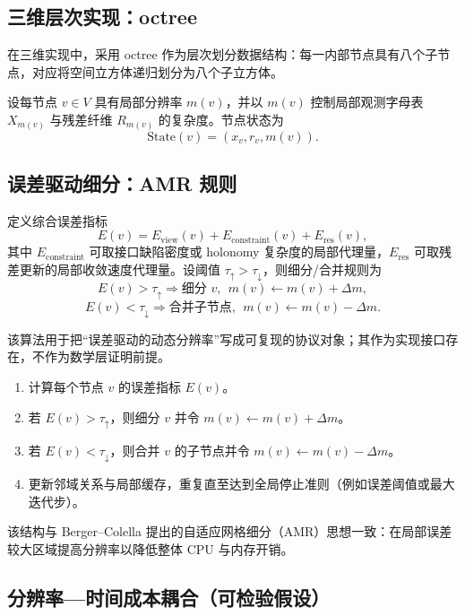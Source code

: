 \subsection{三维层次实现：octree}

在三维实现中，采用 octree 作为层次划分数据结构：每一内部节点具有八个子节点，对应将空间立方体递归划分为八个子立方体。\cite{wikipedia_octree}

设每节点 $v\in V$ 具有局部分辨率 $m(v)$，并以 $m(v)$ 控制局部观测字母表 $X_{m(v)}$ 与残差纤维 $R_{m(v)}$ 的复杂度。节点状态为
$$
\mathrm{State}(v)=(x_v,r_v,m(v)).
$$

\subsection{误差驱动细分：AMR 规则}

定义综合误差指标
$$
E(v)=E_{\mathrm{view}}(v)+E_{\mathrm{constraint}}(v)+E_{\mathrm{res}}(v),
$$
其中 $E_{\mathrm{constraint}}$ 可取接口缺陷密度或 holonomy 复杂度的局部代理量，$E_{\mathrm{res}}$ 可取残差更新的局部收敛速度代理量。设阈值 $\tau_{\uparrow}>\tau_{\downarrow}$，则细分/合并规则为
$$
E(v)>\tau_{\uparrow}\Rightarrow \text{细分 }v,\ \ m(v)\leftarrow m(v)+\Delta m,
$$
$$
E(v)<\tau_{\downarrow}\Rightarrow \text{合并子节点},\ \ m(v)\leftarrow m(v)-\Delta m.
$$

\begin{algorithm}\label{alg:amr_rule}
\InterfaceTag 该算法用于把“误差驱动的动态分辨率”写成可复现的协议对象；其作为实现接口存在，不作为数学层证明前提。
\begin{enumerate}
  \item 计算每个节点 $v$ 的误差指标 $E(v)$。
  \item 若 $E(v)>\tau_{\uparrow}$，则细分 $v$ 并令 $m(v)\leftarrow m(v)+\Delta m$。
  \item 若 $E(v)<\tau_{\downarrow}$，则合并 $v$ 的子节点并令 $m(v)\leftarrow m(v)-\Delta m$。
  \item 更新邻域关系与局部缓存，重复直至达到全局停止准则（例如误差阈值或最大迭代步）。
\end{enumerate}
\end{algorithm}

该结构与 Berger--Colella 提出的自适应网格细分（AMR）思想一致：在局部误差较大区域提高分辨率以降低整体 CPU 与内存开销。\cite{columbia_amr_shock}

\subsection{分辨率—时间成本耦合（可检验假设）}

